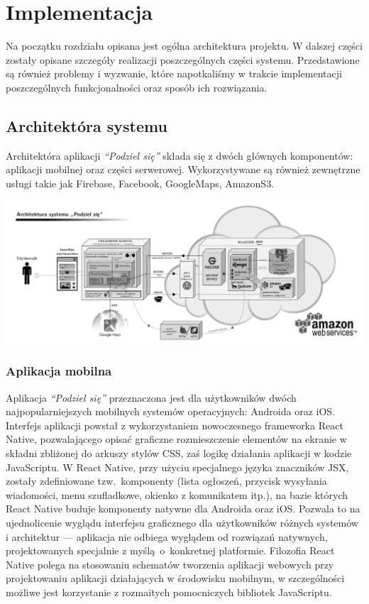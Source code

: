 \documentclass[licencjacka]{pracamgr}
\begin{document}
\chapter{Implementacja}\label{r:arch}

Na początku rozdziału opisana jest ogólna architektura projektu. W dalszej części zostały opisane szczegóły realizacji poszczególnych części systemu. Przedstawione są również problemy i wyzwanie, które napotkaliśmy w trakcie implementacji poszczególnych funkcjonalności oraz sposób ich rozwiązania.

\section{Architektóra systemu}
Architektóra aplikacji \textit{``Podziel się''} składa się z dwóch głównych komponentów: aplikacji mobilnej oraz części serwerowej. Wykorzystywane są również zewnętrzne usługi takie jak Firebase, Facebook, GoogleMaps, AmazonS3.

\includegraphics[width=\linewidth]{architektura.png}

\subsection{Aplikacja mobilna}
Aplikacja \textit{``Podziel się''} przeznaczona jest dla użytkowników dwóch najpopularniejszych mobilnych systemów operacyjnych: Androida oraz iOS\@. Interfejs aplikacji powstał z wykorzystaniem nowoczesnego frameworka React Native, pozwalającego opisać graficzne rozmieszczenie elementów na ekranie w składni zbliżonej do arkuszy stylów CSS, zaś logikę działania aplikacji w kodzie JavaScriptu. W React Native, przy użyciu specjalnego języka znaczników JSX, zostały zdefiniowane tzw.\ komponenty (lista ogłoszeń, przycisk wysyłania wiadomości, menu szufladkowe, okienko z komunikatem itp.), na bazie których React Native buduje komponenty natywne dla Androida oraz iOS\@. Pozwala to na ujednolicenie wyglądu interfejsu graficznego dla użytkowników różnych systemów i architektur --- aplikacja nie odbiega wyglądem od rozwiązań natywnych, projektowanych specjalnie z myślą~o~konkretnej platformie. Filozofia React Native polega na stosowaniu schematów tworzenia aplikacji webowych przy projektowaniu aplikacji działających w środowisku mobilnym, w szczególności możliwe jest korzystanie z rozmaitych pomocniczych bibliotek JavaScriptu.
\end{document}
